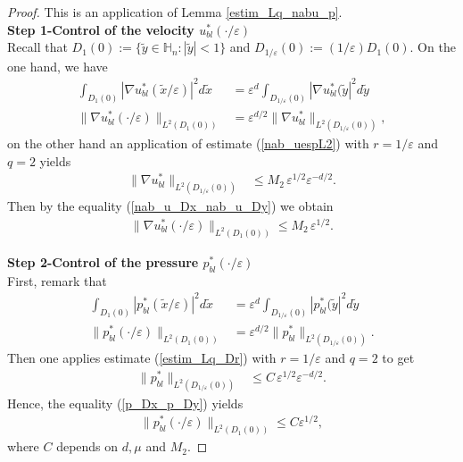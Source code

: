 \documentclass[11pt, reqno]{amsart}
\theoremstyle{definition}
\theoremstyle{remark}
\numberwithin{equation}{section}
\begin{document}
	
	
	\begin{proof} This is an application of Lemma  \ref{estim_Lq_nabu_p}.\\
		\textbf{Step 1-Control of the velocity $ u_{bl}^*(\cdot/\varepsilon) $}\\
		Recall that   $D_{1}(0):= \{ \tilde{y}\in\mathbb{H}_n : |\tilde{y}|< 1 \}$ and  $D_{1/\varepsilon}(0):=  (1/\varepsilon) D_{1}(0)$. On the one hand, we have 
		\begin{align}
			\int_{D_1(0)} |\nabla u_{bl}^*(\tilde{x}/\varepsilon) |^2 d\tilde{x} &=   \varepsilon^d 	\int_{D_{1/\varepsilon}(0)} |\nabla u_{bl}^*(\tilde{y}|^2d\tilde{y}\nonumber\\
			\|\nabla u_{bl}^*(\cdot/\varepsilon) \|_{L^2(D_{1}(0))} & = \varepsilon^{d/2}	\|\nabla u_{bl}^* \|_{L^2(D_{1/\varepsilon}(0))},\label{nab_u_Dx_nab_u_Dy}
		\end{align}
		on the other hand an application of estimate (\ref{nab_uespL2}) with $r=1/\varepsilon$ and $q=2$  yields
			\begin{align*}
			\| \nabla u^{*}_{bl} \|_{L^2(D_{1/\varepsilon}(0))}&\leq M_2\,  \varepsilon^{1/2} \varepsilon^{-d/2}.
		\end{align*}
		Then by the equality (\ref{nab_u_Dx_nab_u_Dy}) we obtain 	
		\begin{align*}
			\|\nabla u_{bl}^*(\cdot/\varepsilon) \|_{L^2(D_1(0))}\leq M_2 \, \varepsilon^{1/2}.
		\end{align*}
		
		
		
		
		\noindent \textbf{Step 2-Control of the pressure  $p_{bl}^*(\cdot/\varepsilon) $} \\
		First, remark that 
		\begin{align}
			\int_{D_1(0)} |p_{bl}^*(\tilde{x}/\varepsilon) |^2 d\tilde{x} &=   \varepsilon^d 	\int_{D_{1/\varepsilon}(0)} | p_{bl}^*(\tilde{y}|^2d\tilde{y}\nonumber\\
			\|p_{bl}^*(\cdot/\varepsilon) \|_{L^2(D_{1}(0))} & = \varepsilon^{d/2}	\|p_{bl}^* \|_{L^2(D_{1/\varepsilon}(0))}.\label{p_Dx_p_Dy}
		\end{align}
	Then one applies estimate (\ref{estim_Lq_Dr})  with $r=1/\varepsilon$ and $q=2$  to get
		\begin{align*}
			\|p^{*}_{bl} \|_{L^2(D_{1/\varepsilon}(0))}&\leq C\,  \varepsilon^{1/2} \varepsilon^{-d/2}.
		\end{align*}
		Hence, the equality (\ref{p_Dx_p_Dy}) yields
		\begin{align}
			\|p^{*}_{bl}(\cdot/\varepsilon)\|_{L^2(D_1(0))} \leq   C  \varepsilon^{1/2} ,
		\end{align}where $C$ depends on $d,\mu$ and $M_2$.	
	\end{proof}
	
\end{document}
